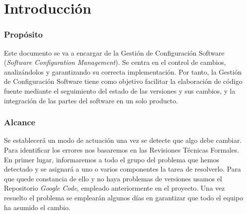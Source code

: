 \documentclass[spanish,a4paper,11pt, twoside]{report}	%
\begin{document}
\newpage
\mbox{}
\thispagestyle{empty}						%
\newpage


\tableofcontents 							%

\newpage
\mbox{}
\thispagestyle{empty}						%
\newpage


\part{Introducción}
	\section{Propósito}Este documento se va a encargar de la Gestión de Configuración Software (\textit{Software Configuration Management}). Se centra en el control de cambios, analizándolos y garantizando su correcta implementación. Por tanto, la Gestión de Configuración Software tiene como objetivo facilitar la elaboración de código fuente mediante el seguimiento del estado de las versiones y sus cambios, y la integración de las partes del software en un solo producto.
	\section{Alcance}Se establecerá un modo de actuación una vez se detecte que algo debe cambiar. Para identificar los errores nos basaremos en las Revisiones Técnicas Formales. En primer lugar, informaremos a todo el grupo del problema que hemos detectado y se asignará a uno o varios componentes la tarea de resolverlo. Para que quede constancia de ello y no haya problemas de versiones usamos el Repositorio \textit{Google Code}, empleado anteriormente en el proyecto. Una vez resuelto el problema se emplearán algunos días en garantizar que todo el equipo  ha asumido el cambio.
\end{document}

